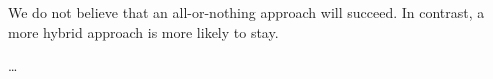 
We do not believe that an all-or-nothing approach will succeed. In contrast, a more hybrid approach is more likely to stay.

\ldots

